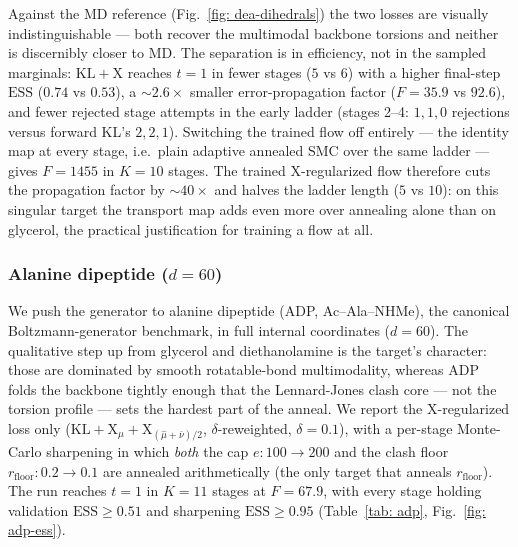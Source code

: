\documentclass[11pt]{article}
\providecommand{\KL}{\mathrm{KL}}
\providecommand{\X}{\mathrm{X}}
\providecommand{\ESS}{\mathrm{ESS}}
\begin{document}
Against the MD reference (Fig.~\ref{fig: dea-dihedrals}) the two losses are visually indistinguishable --- both
recover the multimodal backbone torsions and neither is discernibly closer to MD. The separation is in
efficiency, not in the sampled marginals: $\KL{+}\X$ reaches $t = 1$ in fewer stages ($5$ vs $6$) with a higher
final-step $\ESS$ ($0.74$ vs $0.53$), a $\sim 2.6\times$ smaller error-propagation factor ($F = 35.9$ vs
$92.6$), and fewer rejected stage attempts in the early ladder (stages 2--4: $1,1,0$ rejections versus forward
KL's $2,2,1$). Switching the trained flow off entirely --- the identity map at every stage, i.e.\ plain
adaptive annealed SMC over the same ladder --- gives $F = 1455$ in $K = 10$ stages. The trained
$\X$-regularized flow therefore cuts the propagation factor by $\sim$$40\times$ and halves the ladder length
($5$ vs $10$): on this singular target the transport map adds even more over annealing alone than on glycerol,
the practical justification for training a flow at all.

\FloatBarrier
\subsubsection{Alanine dipeptide ($d = 60$)}
\label{sec: adp}

We push the generator to alanine dipeptide (ADP, Ac--Ala--NHMe), the canonical Boltzmann-generator benchmark,
in full internal coordinates ($d = 60$). The qualitative step up from glycerol and diethanolamine is the
target's character: those are dominated by smooth rotatable-bond multimodality, whereas ADP folds the backbone
tightly enough that the Lennard-Jones clash core --- not the torsion profile --- sets the hardest part of the
anneal. We report the $\X$-regularized loss only ($\KL{+}\X_\mu{+}\X_{(\hat\mu+\bar\nu)/2}$,
$\delta$-reweighted, $\delta = 0.1$), with a per-stage Monte-Carlo sharpening in which \emph{both} the cap
$e\!:\!100\!\to\!200$ and the clash floor $r_{\mathrm{floor}}\!:\!0.2\!\to\!0.1$ are annealed arithmetically
(the only target that anneals $r_{\mathrm{floor}}$). The run reaches $t = 1$ in $K = 11$ stages at $F = 67.9$,
with every stage holding validation $\ESS \ge 0.51$ and sharpening $\ESS \ge 0.95$
(Table~\ref{tab: adp}, Fig.~\ref{fig: adp-ess}).
\end{document}

